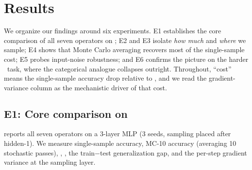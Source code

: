 \section{Results}\label{sec:results}

We organize our findings around six experiments. E1 establishes the core comparison of all seven operators on \mnist; E2 and E3 isolate \emph{how much} and \emph{where} we sample; E4 shows that Monte Carlo averaging recovers most of the single-sample cost; E5 probes input-noise robustness; and E6 confirms the picture on the harder \cifar\ task, where the categorical analogue collapses outright. Throughout, ``cost'' means the single-sample accuracy drop relative to \detmode, and we read the gradient-variance column as the mechanistic driver of that cost.

\subsection{E1: Core comparison on \mnist}\label{sec:e1}

 reports all seven operators on a 3-layer MLP (3 seeds, sampling placed after hidden-1). We measure single-sample accuracy, MC-10 accuracy (averaging 10 stochastic passes), \nll, \ece, the train$-$test generalization gap, and the per-step gradient variance at the sampling layer.

\begin{table}[t]
\centering
\caption{\textbf{E1: core comparison on \mnist}\ (MLP, 3 seeds, sampling after hidden-1). Acc (1 sample) and Acc (MC-10) are test accuracies; Gen-gap is train$-$test accuracy; Grad-var is the gradient variance at the sampling layer. Best value per column in \textbf{bold}. The cost ordering \gaussreparam$\approx$\detmode\ $\ll$ \bernoullist\ $\ll$ categorical (\gumbelsoft, \gumbelst) is tracked exactly by the Grad-var column.}
\label{tab:e1}
\end{table}

